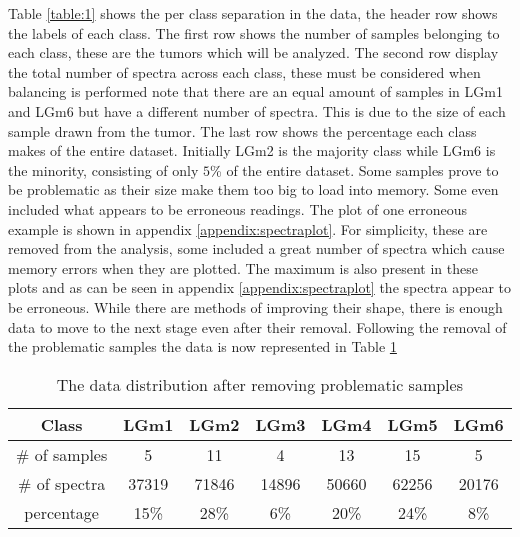\newpage
Table \ref{table:1} shows the per class separation in the data, the header row shows the labels of each class. The first row shows the number of samples belonging to each class, these are the tumors which will be analyzed. The second row display the total number of spectra across each class, these must be considered when balancing is performed note that there are an equal amount of samples in LGm1 and LGm6 but have a different number of spectra. This is due to the size of each sample drawn from the tumor. The last row shows the percentage each class makes of the entire dataset. Initially LGm2 is the majority class while LGm6 is the minority, consisting of only $5$\% of the entire dataset. Some samples prove to be problematic as their size make them too big to load into memory. Some even included what appears to be erroneous readings. The plot of one erroneous example is shown in appendix \ref{appendix:spectraplot}. For simplicity, these are removed from the analysis, some included a great number of spectra which cause memory errors when they are plotted. The maximum is also present in these plots and as can be seen in appendix \ref{appendix:spectraplot} the spectra appear to be erroneous. While there are methods of improving their shape, there is enough data to move to the next stage even after their removal. Following the removal of the problematic samples the data is now represented in Table \ref{table:2}
\\

\begin{table}[h!]
\centering
 \begin{tabular}{||c c c c c c c||} 
 \hline
 Class & LGm1 & LGm2 & LGm3 & LGm4 & LGm5 & LGm6 \\ [0.5ex] 
 \hline\hline
 \# of samples & 5& 11 & 4 & 13 & 15 & 5 \\ 
 \hline
 \# of spectra & 37319 & 71846 & 14896 & 50660 & 62256 & 20176 \\
 \hline
 percentage & 15\%& 28\% & 6\% & 20\% & 24\% & 8\% \\
 \hline

\end{tabular}
\caption{The data distribution after removing problematic samples}
\label{table:2}
\end{table}



